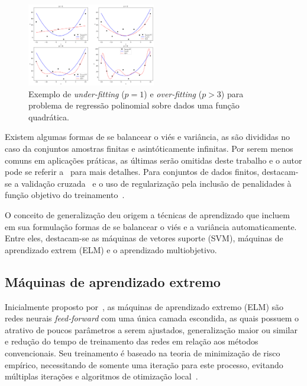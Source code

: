 \documentclass[conference]{IEEEtran}
\begin{document}
    \begin{figure}[thpbh]
    	\centering
    	\includegraphics[width=0.5\textwidth]{bias-var-example.png}
	    \caption{Exemplo de \textit{under-fitting} ($p=1$) e \textit{over-fitting} ($p > 3$) para problema de regressão polinomial sobre dados uma função quadrática.}
	    \label{fig:bias-var}
    \end{figure}
    
	Existem algumas formas de se balancear o viés e variância, as são divididas no caso da conjuntos amostras finitas e asintóticamente infinitas. Por serem menos comuns em aplicações práticas, as últimas serão omitidas deste trabalho e o autor pode se referir a~\cite{geman1992neural} para mais detalhes. Para conjuntos de dados finitos, destacam-se a validação cruzada~\cite{arlot2010survey} e o uso de regularização pela inclusão de penalidades à função objetivo do treinamento~\cite{girosi1995regularization}.  
	
	
	
	
	O conceito de generalização deu origem a técnicas de aprendizado que incluem em sua formulação formas de se balancear o viés e a variância automaticamente. Entre eles, destacam-se as máquinas de vetores suporte (SVM), máquinas de aprendizado extrem (ELM)  e o aprendizado multiobjetivo.
	
	\subsection{Máquinas de aprendizado extremo}
	Inicialmente proposto por~\cite{huang2004extreme}, as máquinas de aprendizado extremo (ELM) são redes neurais \textit{feed-forward} com uma única camada escondida, as quais possuem o atrativo de poucos parâmetros a serem ajustados, generalização maior ou similar e redução do tempo de treinamento das redes em relação aos métodos convencionais. Seu treinamento é baseado na teoria de minimização de risco empírico, necessitando de somente uma iteração para este processo, evitando múltiplas iterações e algoritmos de otimização local~\cite{ding2015extreme}. 
	
\end{document}
